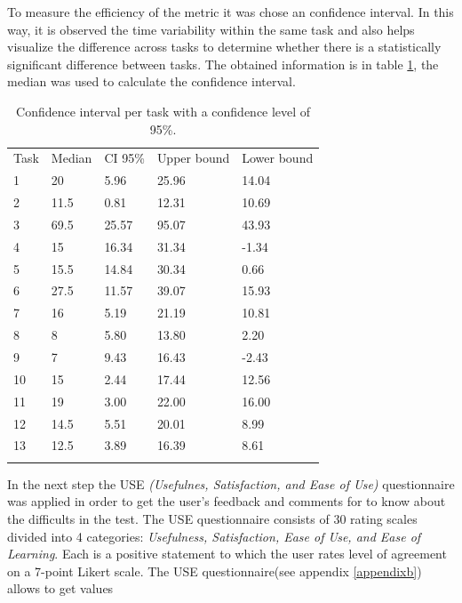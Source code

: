 To measure the efficiency of the metric it was chose an confidence interval.  In
this way, it is observed the time variability within the same task and  also
helps visualize the difference across tasks to determine whether there is a
statistically significant difference between tasks. The obtained information is
in table \ref{tab:ic}, the median was used to calculate the confidence interval.
\begin{table}
\centering
\small
\captionsetup{font=footnotesize}
\caption{Confidence interval per task with a confidence level of 95\%. }
\label{tab:ic}    
\begin{tabular}{lllll}
\hline\noalign{\smallskip}
Task  & Median & CI 95\% & Upper bound & Lower bound  \\
\noalign{\smallskip}\hline\noalign{\smallskip}
1 &    20         & 5.96  & 25.96 & 14.04  \\
2 &    11.5      & 0.81  & 12.31  & 10.69   \\
3 &    69.5      &  25.57   &  95.07  &  43.93   \\
4 &    15        & 16.34  &  31.34  &  -1.34   \\
5 &    15.5     &  14.84  &  30.34  &  0.66  \\
6 &     27.5    &   11.57  &  39.07  &  15.93    \\
7 &     16       &  5.19  & 21.19  &  10.81   \\
8 &     8         &   5.80  &  13.80  & 2.20 \\
9 &     7         & 9.43  &  16.43  &  -2.43  \\
10 &   15       &   2.44  &  17.44   &  12.56   \\
11 &   19       &  3.00  &  22.00  &  16.00   \\
12 &   14.5    &  5.51  &  20.01  &  8.99   \\
13 &   12.5    &  3.89  &  16.39  &  8.61    \\
\noalign{\smallskip}\hline
\end{tabular}
\end{table}
In the next step the USE \textit{(Usefulnes, Satisfaction, and Ease of
Use)} questionnaire \cite{morris2001experience} was applied in order
to get the user's feedback and comments for to know about the
difficults in the test.  The USE questionnaire consists of 30 rating
scales divided into 4 categories: \textit{Usefulness, Satisfaction,
Ease of Use, and Ease of Learning}. Each is a positive statement to
which the user rates level of agreement on a 7-point Likert scale. The
USE questionnaire(see appendix \ref{appendixb}) allows to get values
